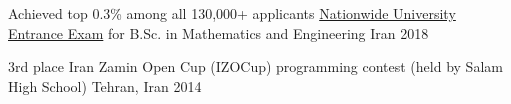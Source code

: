 
\begin{cvhonors}

  \cvhonor
    {Achieved top 0.3\% among all 130,000+ applicants} %
    {\href{https://en.wikipedia.org/wiki/Iranian_University_Entrance_Exam}{Nationwide University Entrance Exam} for B.Sc. in Mathematics and Engineering} %
    {Iran} %
    {2018} %

  \cvhonor
    {3rd place} %
    {Iran Zamin Open Cup (IZOCup) programming contest (held by Salam High School)} %
    {Tehran, Iran} %
    {2014} %


\end{cvhonors}
